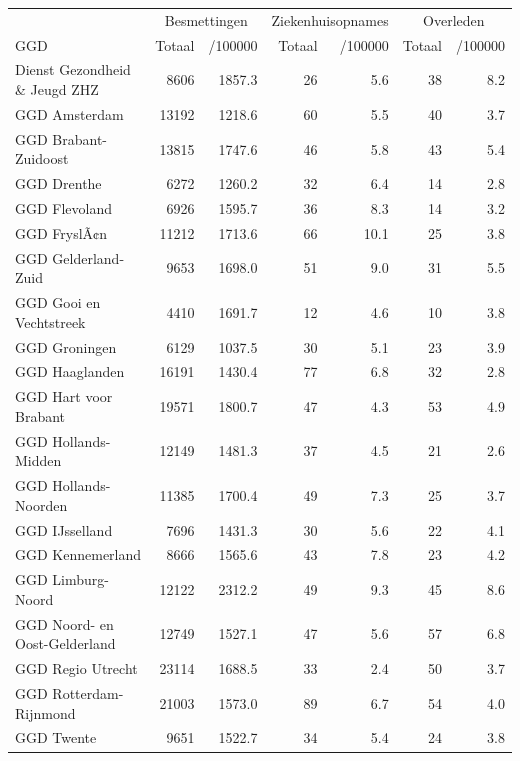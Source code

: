\documentclass[
  english,
  man,floatsintext]{apa6}
\begin{document}
\begin{table}
\centering\begingroup\fontsize{10}{12}\selectfont

\begin{threeparttable}
\begin{tabular}{lrrrrrr}
\toprule
\multicolumn{1}{c}{ } & \multicolumn{2}{c}{Besmettingen} & \multicolumn{2}{c}{Ziekenhuisopnames} & \multicolumn{2}{c}{Overleden} \\
\cmidrule(l{3pt}r{3pt}){2-3} \cmidrule(l{3pt}r{3pt}){4-5} \cmidrule(l{3pt}r{3pt}){6-7}
GGD & Totaal & /100000 & Totaal & /100000 & Totaal & /100000\\
\midrule
Dienst Gezondheid \& Jeugd ZHZ & 8606 & 1857.3 & 26 & 5.6 & 38 & 8.2\\
GGD Amsterdam & 13192 & 1218.6 & 60 & 5.5 & 40 & 3.7\\
GGD Brabant-Zuidoost & 13815 & 1747.6 & 46 & 5.8 & 43 & 5.4\\
GGD Drenthe & 6272 & 1260.2 & 32 & 6.4 & 14 & 2.8\\
GGD Flevoland & 6926 & 1595.7 & 36 & 8.3 & 14 & 3.2\\
GGD FryslÃ¢n & 11212 & 1713.6 & 66 & 10.1 & 25 & 3.8\\
GGD Gelderland-Zuid & 9653 & 1698.0 & 51 & 9.0 & 31 & 5.5\\
GGD Gooi en Vechtstreek & 4410 & 1691.7 & 12 & 4.6 & 10 & 3.8\\
GGD Groningen & 6129 & 1037.5 & 30 & 5.1 & 23 & 3.9\\
GGD Haaglanden & 16191 & 1430.4 & 77 & 6.8 & 32 & 2.8\\
GGD Hart voor Brabant & 19571 & 1800.7 & 47 & 4.3 & 53 & 4.9\\
GGD Hollands-Midden & 12149 & 1481.3 & 37 & 4.5 & 21 & 2.6\\
GGD Hollands-Noorden & 11385 & 1700.4 & 49 & 7.3 & 25 & 3.7\\
GGD IJsselland & 7696 & 1431.3 & 30 & 5.6 & 22 & 4.1\\
GGD Kennemerland & 8666 & 1565.6 & 43 & 7.8 & 23 & 4.2\\
GGD Limburg-Noord & 12122 & 2312.2 & 49 & 9.3 & 45 & 8.6\\
GGD Noord- en Oost-Gelderland & 12749 & 1527.1 & 47 & 5.6 & 57 & 6.8\\
GGD Regio Utrecht & 23114 & 1688.5 & 33 & 2.4 & 50 & 3.7\\
GGD Rotterdam-Rijnmond & 21003 & 1573.0 & 89 & 6.7 & 54 & 4.0\\
GGD Twente & 9651 & 1522.7 & 34 & 5.4 & 24 & 3.8\\

\end{tabular}
\end{threeparttable}
\end{table}
\end{document}

